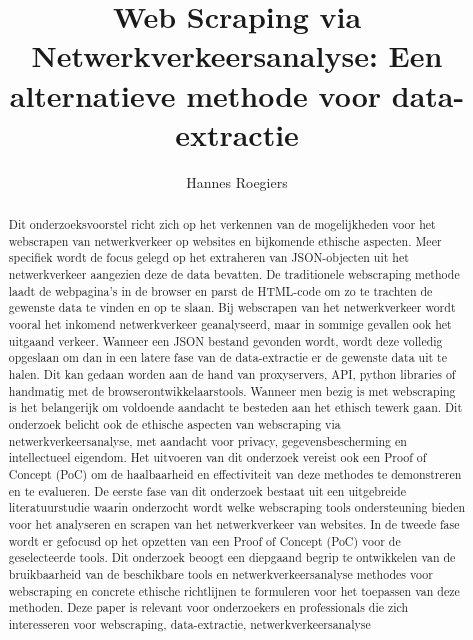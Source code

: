 \documentclass{hogent-article}
\title{Web Scraping via Netwerkverkeersanalyse: Een alternatieve methode voor data-extractie}
\author{Hannes Roegiers}
\begin{document}
\begin{abstract}
  Dit onderzoeksvoorstel richt zich op het verkennen van de mogelijkheden voor het webscrapen van netwerkverkeer op websites en bijkomende ethische aspecten. Meer specifiek wordt de focus gelegd
  op het extraheren van JSON-objecten uit het netwerkverkeer aangezien deze de data bevatten. De traditionele webscraping methode laadt de webpagina's in de browser en parst de HTML-code om zo
  te trachten de gewenste data te vinden en op te slaan. Bij webscrapen van het netwerkverkeer wordt vooral het inkomend netwerkverkeer geanalyseerd, maar in sommige gevallen ook het uitgaand verkeer.
  Wanneer een JSON bestand gevonden wordt, wordt deze volledig opgeslaan om dan in een latere fase van de data-extractie er de gewenste data uit te halen. Dit kan gedaan worden aan de hand van proxyservers, API, 
  python libraries of handmatig met de browserontwikkelaarstools. Wanneer men bezig is met webscraping is het belangerijk om voldoende aandacht te besteden aan het ethisch tewerk gaan. Dit onderzoek belicht ook de ethische aspecten
  van webscraping via netwerkverkeersanalyse, met aandacht voor privacy, gegevensbescherming en intellectueel eigendom.
  Het uitvoeren van dit onderzoek vereist ook een Proof of Concept (PoC) om de haalbaarheid en effectiviteit van deze methodes te demonstreren en te evalueren.
  De eerste fase van dit onderzoek bestaat uit een uitgebreide literatuurstudie waarin onderzocht wordt welke webscraping tools ondersteuning bieden voor het analyseren en scrapen van het netwerkverkeer van websites.
  In de tweede fase wordt er gefocusd op het opzetten van een Proof of Concept (PoC) voor de geselecteerde tools. Dit onderzoek beoogt een diepgaand begrip te ontwikkelen van de bruikbaarheid van de
  beschikbare tools en netwerkverkeersanalyse methodes voor webscraping en concrete ethische richtlijnen te formuleren voor het toepassen van deze methoden. Deze paper is relevant voor onderzoekers en professionals die zich interesseren voor webscraping, data-extractie, netwerkverkeersanalyse

\end{abstract}

\tableofcontents



\printbibliography[heading=bibintoc]
\end{document}
